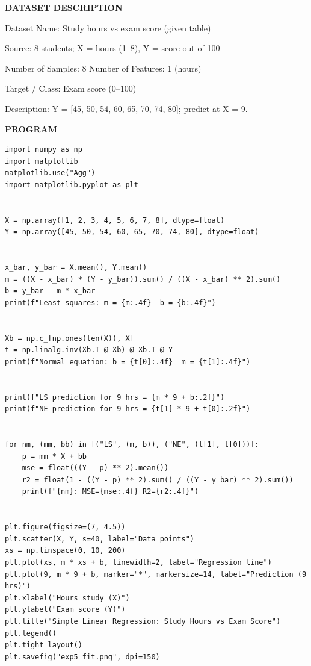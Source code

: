 \documentclass[11pt,twoside]{article}
\newcommand{\expheading}[1]{{\fontsize{14}{17}\selectfont\textbf{#1}\par}}
\newcommand{\toevenpage}{\clearpage\ifodd\value{page}\null\thispagestyle{empty}\newpage\fi}
\begin{document}
{\expheading{DATASET DESCRIPTION}
\vspace{4pt}
\noindent Dataset Name: Study hours vs exam score (given table)\par
\noindent Source: 8 students; X = hours (1--8), Y = score out of 100\par
\noindent Number of Samples: 8 \hspace{0.3cm} Number of Features: 1 (hours)\par
\noindent Target / Class: Exam score (0--100)\par
\noindent Description: Y = [45, 50, 54, 60, 65, 70, 74, 80]; predict at X = 9. \par
\vspace{4pt}
} %

\toevenpage
\expheading{PROGRAM}
\vspace{6pt}

\begin{lstlisting}
import numpy as np
import matplotlib
matplotlib.use("Agg")
import matplotlib.pyplot as plt


X = np.array([1, 2, 3, 4, 5, 6, 7, 8], dtype=float)
Y = np.array([45, 50, 54, 60, 65, 70, 74, 80], dtype=float)


x_bar, y_bar = X.mean(), Y.mean()
m = ((X - x_bar) * (Y - y_bar)).sum() / ((X - x_bar) ** 2).sum()
b = y_bar - m * x_bar
print(f"Least squares: m = {m:.4f}  b = {b:.4f}")


Xb = np.c_[np.ones(len(X)), X]
t = np.linalg.inv(Xb.T @ Xb) @ Xb.T @ Y
print(f"Normal equation: b = {t[0]:.4f}  m = {t[1]:.4f}")


print(f"LS prediction for 9 hrs = {m * 9 + b:.2f}")
print(f"NE prediction for 9 hrs = {t[1] * 9 + t[0]:.2f}")


for nm, (mm, bb) in [("LS", (m, b)), ("NE", (t[1], t[0]))]:
    p = mm * X + bb
    mse = float(((Y - p) ** 2).mean())
    r2 = float(1 - ((Y - p) ** 2).sum() / ((Y - y_bar) ** 2).sum())
    print(f"{nm}: MSE={mse:.4f} R2={r2:.4f}")


plt.figure(figsize=(7, 4.5))
plt.scatter(X, Y, s=40, label="Data points")
xs = np.linspace(0, 10, 200)
plt.plot(xs, m * xs + b, linewidth=2, label="Regression line")
plt.plot(9, m * 9 + b, marker="*", markersize=14, label="Prediction (9 hrs)")
plt.xlabel("Hours study (X)")
plt.ylabel("Exam score (Y)")
plt.title("Simple Linear Regression: Study Hours vs Exam Score")
plt.legend()
plt.tight_layout()
plt.savefig("exp5_fit.png", dpi=150)
\end{lstlisting}
\end{document}
